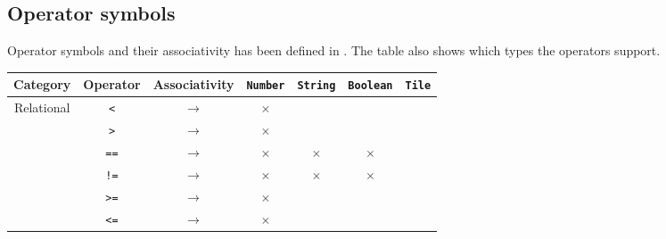 \subsection{Operator symbols}
Operator symbols and their associativity has been defined in . The table also shows which types the operators support.

\begin{table}[H]
    \centering
    \begin{tabular}{ |c|c|c||c|c|c|c| }
        \hline
        \textbf{Category} & \textbf{Operator} & \textbf{Associativity} & \texttt{Number} & \texttt{String} & \texttt{Boolean} & \texttt{Tile} \\
        \hline

        \multirow{6}{*}{Relational}
                          & \texttt{<}
                          & $\rightarrow$
                          & $\times$
                          &
                          &
                          &
        \\


                          & \texttt{>}
                          & $\rightarrow$
                          & $\times$
                          &
                          &
                          &
        \\


                          & \texttt{==}
                          & $\rightarrow$
                          & $\times$
                          & $\times$
                          & $\times$
                          &
        \\


                          & \texttt{!=}
                          & $\rightarrow$
                          & $\times$
                          & $\times$
                          & $\times$
                          &
        \\


                          & \texttt{>=}
                          & $\rightarrow$
                          & $\times$
                          &
                          &
                          &
        \\


                          & \texttt{<=}
                          & $\rightarrow$
                          & $\times$
                          &
                          &
                          &
        \\\hline


\end{tabular}
\end{table}
